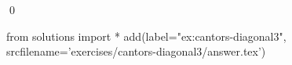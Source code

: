 
\begin{ex} 
  \label{ex:cantors-diagonal3}
  
  \qed
\end{ex} 
\begin{python0}
from solutions import *
add(label="ex:cantors-diagonal3",
    srcfilename='exercises/cantors-diagonal3/answer.tex') 
\end{python0}
